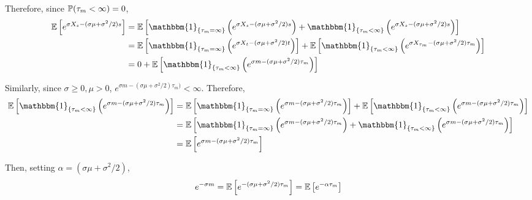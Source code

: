 \documentclass[10pt]{article}
\begin{document}
\begin{solution}[Solution]
Therefore, since \( \mathbb{P}(\tau_m <\infty) = 0 \),
\begin{align*}
    \EE \left[ e^{\sigma X_s - (\sigma \mu+\sigma^2/2) s} \right]
    &= \EE \left[ \mathbbm{1}_{\{\tau_m = \infty\}} \left( e^{\sigma X_s - (\sigma \mu+\sigma^2/2) s} \right)+ \mathbbm{1}_{\{\tau_m < \infty\}} \left( e^{\sigma X_s - (\sigma \mu+\sigma^2/2) s} \right) \right]
    \\&= \EE \left[ \mathbbm{1}_{\{\tau_m = \infty \}} \left( e^{\sigma X_t - (\sigma \mu+\sigma^2/2) t} \right) \right] + \EE \left[ \mathbbm{1}_{\{\tau_m<\infty\}} \left( e^{\sigma X_{\tau_m} - (\sigma \mu+\sigma^2/2) \tau_m} \right) \right]
    \\&= 0 + \EE \left[ \mathbbm{1}_{\{\tau_m<\infty\}} \left( e^{\sigma m - (\sigma \mu+\sigma^2/2) \tau_m} \right) \right]
\end{align*}

Similarly, since \( \sigma\geq 0, \mu>0 \), \( e^{\sigma m - (\sigma\mu+\sigma^2/2)\tau_m) } < \infty  \). Therefore,
\begin{align*}
    \EE \left[ \mathbbm{1}_{\{\tau_m<\infty\}} \left( e^{\sigma m - (\sigma \mu+\sigma^2/2) \tau_m} \right) \right]
    &= \EE \left[ \mathbbm{1}_{\{\tau_m=\infty\}} \left( e^{\sigma m - (\sigma \mu+\sigma^2/2) \tau_m} \right) \right]
    +\EE \left[ \mathbbm{1}_{\{\tau_m<\infty\}} \left( e^{\sigma m - (\sigma \mu+\sigma^2/2) \tau_m} \right) \right]
    \\&= \EE \left[ \mathbbm{1}_{\{\tau_m=\infty\}} \left( e^{\sigma m - (\sigma \mu+\sigma^2/2) \tau_m} \right) + \mathbbm{1}_{\{\tau_m<\infty\}} \left( e^{\sigma m - (\sigma \mu+\sigma^2/2) \tau_m} \right) \right]
    \\&= \EE \left[ e^{\sigma m - (\sigma \mu+\sigma^2/2) \tau_m} \right]
\end{align*}

\iffalse
In the limit \( t\to\infty \), since \( \tau_m < \infty\) a.s. , \( s = \min\{t,\tau_m\} \to \tau_m < \infty \) and \( X_s \to X_{\tau_m} = m \). Thus,
\begin{align*}
    1 = \lim_{t\to\infty} \EE \left[ e^{\sigma X_s - (\sigma \mu+\sigma^2/2) s} \right]
      = \EE \left[ \lim_{t\to\infty} e^{\sigma X_s - (\sigma \mu+\sigma^2/2) s} \right]
      = \EE \left[ e^{\sigma m - (\sigma \mu+\sigma^2/2) \tau_m} \right]
\end{align*}
\fi

Then, setting \( \alpha = (\sigma\mu+\sigma^2/2) \),
\begin{align*}
    e^{-\sigma m} = \mathbb{E} \left[ e^{-(\sigma \mu+\sigma^2/2)\tau_m} \right] = \mathbb{E} \left[ e^{-\alpha \tau_m} \right]
\end{align*}


\end{solution}
\end{document}
